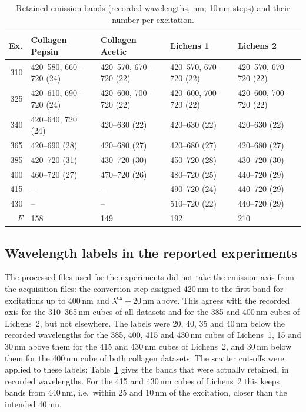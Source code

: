\documentclass[journal]{IEEEtran}
\begin{document}
\begin{table}[!t]
\centering
\caption{Retained emission bands (recorded wavelengths, nm; 10\,nm steps) and their number per excitation.}
\label{tab:bands}
\scriptsize
\setlength{\tabcolsep}{2.5pt}
\begin{tabular}{rllll}
\toprule
Ex. & Collagen Pepsin & Collagen Acetic & Lichens 1 & Lichens 2 \\
\midrule
310 & 420--580, 660--720 (24) & 420--570, 670--720 (22) & 420--570, 670--720 (22) & 420--570, 670--720 (22) \\
325 & 420--610, 690--720 (24) & 420--600, 700--720 (22) & 420--600, 700--720 (22) & 420--600, 700--720 (22) \\
340 & 420--640, 720 (24) & 420--630 (22) & 420--630 (22) & 420--630 (22) \\
365 & 420--690 (28) & 420--680 (27) & 420--680 (27) & 420--680 (27) \\
385 & 420--720 (31) & 430--720 (30) & 450--720 (28) & 430--720 (30) \\
400 & 460--720 (27) & 470--720 (26) & 480--720 (25) & 440--720 (29) \\
415 & -- & -- & 490--720 (24) & 440--720 (29) \\
430 & -- & -- & 510--720 (22) & 440--720 (29) \\
\midrule
$F$ & 158 & 149 & 192 & 210 \\
\bottomrule
\end{tabular}
\end{table}

\subsection{Wavelength labels in the reported experiments}\label{sec:wl}
The processed files used for the experiments did not take the emission axis from the acquisition files: the conversion step assigned 420\,nm to the first band for excitations up to 400\,nm and $\lambda^{\mathrm{ex}}+20$\,nm above. This agrees with the recorded axis for the 310--365\,nm cubes of all datasets and for the 385 and 400\,nm cubes of Lichens~2, but not elsewhere. The labels were 20, 40, 35 and 40\,nm below the recorded wavelengths for the 385, 400, 415 and 430\,nm cubes of Lichens~1, 15 and 30\,nm above them for the 415 and 430\,nm cubes of Lichens~2, and 30\,nm below them for the 400\,nm cube of both collagen datasets. The scatter cut-offs were applied to these labels; Table~\ref{tab:bands} gives the bands that were actually retained, in recorded wavelengths. For the 415 and 430\,nm cubes of Lichens~2 this keeps bands from 440\,nm, i.e.\ within 25 and 10\,nm of the excitation, closer than the intended 40\,nm.
\end{document}
